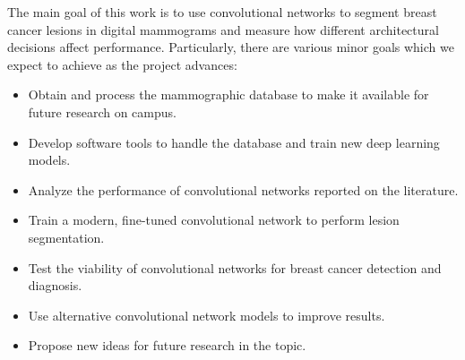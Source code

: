The main goal of this work is to use convolutional networks to segment breast cancer lesions in digital mammograms and measure how different architectural decisions affect performance. %
Particularly, there are various minor goals which we expect to achieve as the project advances:
\begin{itemize}
	\item Obtain and process the mammographic database to make it available for future research on campus.
	\item Develop software tools to handle the database and train new deep learning models.
	\item Analyze the performance of convolutional networks reported on the literature.
	\item Train a modern, fine-tuned convolutional network to perform lesion segmentation.
	\item Test the viability of convolutional networks for breast cancer detection and diagnosis.
	\item Use alternative convolutional network models to improve results.
	\item Propose new ideas for future research in the topic.
\end{itemize}
